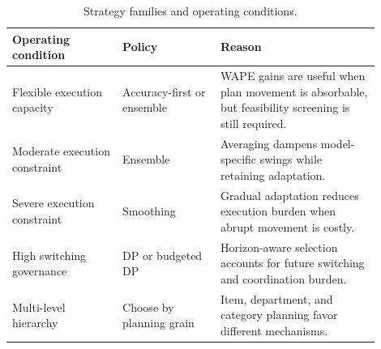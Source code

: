 \begin{table}[H]
\centering
\caption{Strategy families and operating conditions.}
\label{tab:deployment-guidance}
\scriptsize
\renewcommand{\arraystretch}{0.85}
\begin{tabular}{@{}p{0.27\linewidth}p{0.24\linewidth}p{0.39\linewidth}@{}}
\toprule
\textbf{Operating condition} & \textbf{Policy} & \textbf{Reason} \\
\midrule
Flexible execution capacity & Accuracy-first or ensemble & WAPE gains are useful when plan movement is absorbable, but feasibility screening is still required. \\
Moderate execution constraint & Ensemble & Averaging dampens model-specific swings while retaining adaptation. \\
Severe execution constraint & Smoothing & Gradual adaptation reduces execution burden when abrupt movement is costly. \\
High switching governance & DP or budgeted DP & Horizon-aware selection accounts for future switching and coordination burden. \\
Multi-level hierarchy & Choose by planning grain & Item, department, and category planning favor different mechanisms. \\
\bottomrule
\end{tabular}
\end{table}
